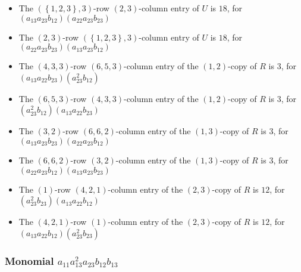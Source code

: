 \documentclass{article}
\begin{document}
\begin{itemize}
\item The $ \left(\left\{1, 2, 3\right\}, 3\right) $-row $ \left(2, 3\right) $-column entry of $U$ is $ 18 $, for $( a_{13} a_{23} b_{12} )( a_{22} a_{23} b_{23} )$ 
\item The $ \left(2, 3\right) $-row $ \left(\left\{1, 2, 3\right\}, 3\right) $-column entry of $U$ is $ 18 $, for $( a_{22} a_{23} b_{23} )( a_{13} a_{23} b_{12} )$ 
\item The $(4, 3, 3)$-row $(6, 5, 3)$-column entry of the $ \left(1, 2\right) $-copy of $R$ is $ 3 $, for $( a_{13} a_{22} b_{23} )( a_{23}^{2} b_{12} )$ 
\item The $(6, 5, 3)$-row $(4, 3, 3)$-column entry of the $ \left(1, 2\right) $-copy of $R$ is $ 3 $, for $( a_{23}^{2} b_{12} )( a_{13} a_{22} b_{23} )$ 
\item The $(3, 2)$-row $(6, 6, 2)$-column entry of the $ \left(1, 3\right) $-copy of $R$ is $ 3 $, for $( a_{13} a_{23} b_{23} )( a_{22} a_{23} b_{12} )$ 
\item The $(6, 6, 2)$-row $(3, 2)$-column entry of the $ \left(1, 3\right) $-copy of $R$ is $ 3 $, for $( a_{22} a_{23} b_{12} )( a_{13} a_{23} b_{23} )$ 
\item The $(1)$-row $(4, 2, 1)$-column entry of the $ \left(2, 3\right) $-copy of $R$ is $ 12 $, for $( a_{23}^{2} b_{23} )( a_{13} a_{22} b_{12} )$ 
\item The $(4, 2, 1)$-row $(1)$-column entry of the $ \left(2, 3\right) $-copy of $R$ is $ 12 $, for $( a_{13} a_{22} b_{12} )( a_{23}^{2} b_{23} )$ 
\end{itemize}
\subsubsection{Monomial $ a_{11} a_{13}^{2} a_{23} b_{12} b_{13} $}
\end{document}
